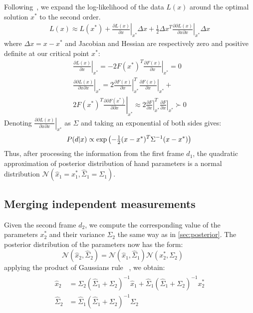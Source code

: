Following~, we expand the log-likelihood of the data $L(x)$ around the optimal solution $x^*$ to the second order.
%
\begin{align}
L(x) \approx L(x^*)   
+ \left. \tfrac{\partial L(x) }{\partial x}\right|_{x^*}  \Delta x 
+ \left. \tfrac{1}{2} \Delta x^T\tfrac{\partial \partial L(x)}{\partial x \partial x} \right|_{x^*} \Delta x 
\end{align}
%
where $\Delta x=x - x^*$ and Jacobian and Hessian are respectively zero and positive definite at our critical point $x^*$:
%
\begin{align*}
\left.\tfrac{\partial L(x)}{\partial x} \right|_{x^*} = - 2 F(x^*)^T 
\left.\tfrac{\partial F(x)}{\partial x}\right|_{x^*} = 0 
\\
\left. \tfrac{\partial \partial L(x)}{\partial x \partial x}  \right|_{x^*}  = 
2 \left.\tfrac{\partial F(x)}{\partial x}\right|_{x^*}^T 
\left.\tfrac{\partial F(x)}{\partial x}\right|_{x^*} + \\
2 F(x^*)^T  \left. \tfrac{\partial \partial F (x^*) }{\partial \partial x} \right|_{x^*}
\approx 2
\left.\tfrac{\partial F}{\partial x}\right|_{x^*}^T  
\left.\tfrac{\partial F}{\partial x}\right|_{x^*}
\succ 0
\end{align*}
% 
Denoting $\left. \tfrac{\partial \partial L(x)}{\partial x \partial x}  \right|_{x^*}  $ as $\Sigma$ and taking an exponential of both sides gives:
%
\begin{equation}
P(d|x) \propto \exp\left(- \tfrac{1}{2}(x - x^*)^T \Sigma^{-1}  (x - x^*) \right)\\
\end{equation}
% 
Thus, after processing the information from the first frame $d_1$, the quadratic approximation of posterior distribution of hand parameters is a normal distribution $\mathcal{N}\left(\hat{x}_1 = x_1^*,  \hat{\Sigma}_1 = \Sigma_1 \right)$.
%

\subsection{Merging independent measurements} 
\label{sec:combining}


Given the second frame $d_2$, we compute the corresponding value of the parameters $x_2^*$ and their variance $\Sigma_2$ the same way as in \ref{sec:posterior}. The posterior distribution of the parameters now has the form:
% 
\begin{equation}
\mathcal{N}(\hat{x}_2, \hat{\Sigma}_2) = \mathcal{N}(\hat{x}_1, \hat{\Sigma}_1) \mathcal{N}(x_2^*, \Sigma_2) \quad\quad
\end{equation}
% 
applying the product of Gaussians rule ~\cite{petersen2008matrix}, we obtain:
% 
\begin{align}
\begin{split}
\hat{x}_2 &= \Sigma_2 (\hat{\Sigma}_1 + \Sigma_2)^{-1} \hat{x}_1 + 
\hat{\Sigma}_1 (\hat{\Sigma}_1 + \Sigma_2)^{-1} x_2^*
\\
\hat{\Sigma}_2 &= \hat{\Sigma}_1 (\hat{\Sigma}_1 + \Sigma_2)^{-1} \Sigma_2
\label{eq:combining}
\end{split}
\end{align}

